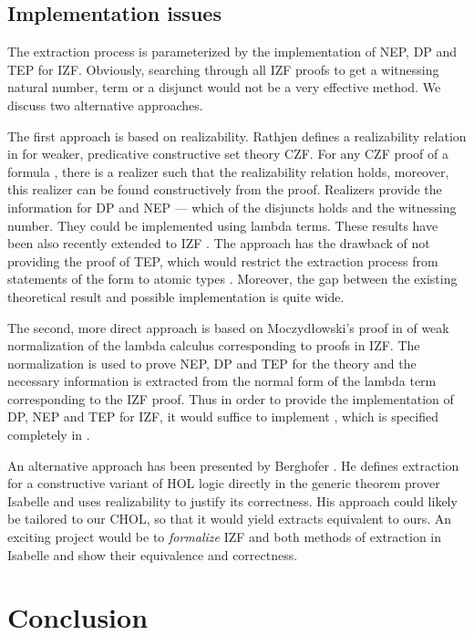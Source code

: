 \documentclass{LMCS}
\begin{document}
\subsection{Implementation issues}\label{dpnep}

The extraction process is parameterized by the implementation of NEP, DP and
TEP for IZF. Obviously, searching through all IZF proofs to get a
witnessing natural number, term or a disjunct would not be a very effective method. 
We discuss two alternative approaches.

The first approach is based on realizability. Rathjen
defines a realizability relation in  \cite{Rat05} for weaker, predicative constructive set
theory CZF. For any CZF proof of a formula , there is a realizer  such
that the realizability relation  holds, moreover, this
realizer can be found constructively from the proof. Realizers provide
the information for DP and NEP --- which of the disjuncts holds and the
witnessing number. They could be implemented using lambda terms. 
These results have been also recently extended to IZF \cite{rathjen2006}.
The approach has the drawback of not providing the proof of TEP, which
would restrict the extraction process from statements of the form  to atomic types . Moreover, the gap between the existing theoretical
result and possible implementation is quite wide.

The second, more direct approach is based on Moczyd\l owski's proof in
\cite{jacsl2006} of weak
normalization of the lambda calculus  corresponding to proofs in IZF. The normalization is used to prove NEP, DP and TEP for the
theory and the necessary information is extracted from the normal form of the
lambda term corresponding to the IZF proof. Thus in order to provide the implementation of DP, NEP and 
TEP for IZF, it would suffice to implement , which is specified
completely in \cite{jacsl2006,jatrinac2006}.

An alternative approach has been presented by Berghofer \cite{Ber04}. He
defines extraction for a constructive variant of HOL logic directly in
the generic theorem prover Isabelle and uses realizability to justify its
correctness. His approach could likely be tailored to our CHOL, so that it
would yield extracts equivalent to ours. An exciting project would be to
\emph{formalize} IZF and both methods of extraction in Isabelle and show
their equivalence and correctness. 

\section{Conclusion}\label{conclusion}
\end{document}
